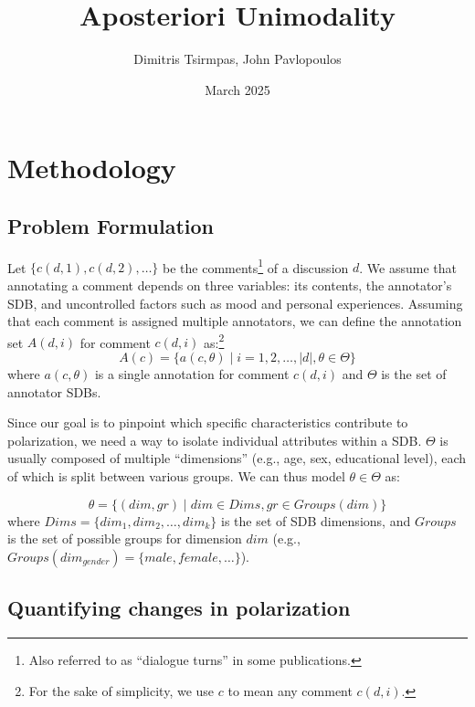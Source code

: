 \documentclass{article}
\title{Aposteriori Unimodality}
\author{Dimitris Tsirmpas, John Pavlopoulos}
\date{March 2025}
\newcommand{\sdbdim}{\textit{dim}}
\newcommand{\Sdbdim}{\textit{Dims}}
\newcommand{\sdbgroup}{\textit{gr}}
\newcommand{\Sdbgroup}{\textit{Groups}}
\begin{document}
\maketitle

\section{Methodology}

\subsection{Problem Formulation}
\label{ssec:methodology:problem}

Let $\{c(d,1), c(d,2), \ldots\}$ be the comments\footnote{Also referred to as “dialogue turns” in some publications.} of a discussion $d$. We assume that annotating a comment depends on three variables: its contents, the annotator's \ac{SDB}, and uncontrolled factors such as mood and personal experiences. Assuming that each comment is assigned multiple annotators, we can define the annotation set $A(d, i)$ for comment $c(d, i)$ as:\footnote{For the sake of simplicity, we use $c$ to mean any comment $c(d, i)$.}
\begin{equation}
    A(c) = \{a(c, \theta) \mid i=1, 2, \ldots, \lvert d \rvert, \theta \in \Theta \}
\end{equation}
\noindent where  $a(c, \theta)$ is a single annotation for comment $c(d,i)$ and $\Theta$ is the set of annotator \acp{SDB}.

Since our goal is to pinpoint which specific characteristics contribute to polarization, we need a way to isolate individual attributes within a \ac{SDB}. $\Theta$ is usually composed of multiple ``dimensions'' (e.g., age, sex, educational level), each of which is split between various groups. We can thus model $\theta \in \Theta$ as:

\begin{equation}
    \theta = \{(\sdbdim, \sdbgroup) \mid \sdbdim \in \Sdbdim, \sdbgroup \in \Sdbgroup(\sdbdim)\}
\end{equation} 
\noindent where $\Sdbdim =\{\sdbdim_1, \sdbdim_2, \ldots, \sdbdim_k\}$ is the set of \ac{SDB} dimensions, and $\Sdbgroup$ is the set of possible groups for dimension $\sdbdim$ (e.g., $\Sdbgroup(\sdbdim_{\textit{gender}}) = \{\textit{male}, \textit{female}, \ldots\}$).


\subsection{Quantifying changes in polarization}
\label{ssec:methodology:polstat}
\end{document}
